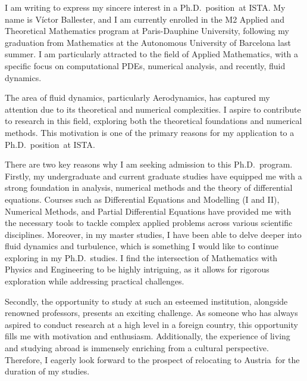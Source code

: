 \documentclass{letter}
\newcommand{\program}{Ph.D.\ position}
\newcommand{\uni}{ISTA}
\newcommand{\city}{Austria}
\begin{document}
\begin{letter}




  I am writing to express my sincere interest in a \program\ at \uni. My name is Víctor Ballester, and I am currently enrolled in the M2 Applied and Theoretical Mathematics program at Paris-Dauphine University, following my graduation from Mathematics at the Autonomous University of Barcelona last summer. I am particularly attracted to the field of Applied Mathematics, with a specific focus on computational PDEs, numerical analysis, and recently, fluid dynamics.


  The area of fluid dynamics, particularly Aerodynamics, has captured my attention due to its theoretical and numerical complexities. I aspire to contribute to research in this field, exploring both the theoretical foundations and numerical methods. This motivation is one of the primary reasons for my application to a \program\ at \uni.


  There are two key reasons why I am seeking admission to this Ph.D.\ program. Firstly, my undergraduate and current graduate studies have equipped me with a strong foundation in analysis, numerical methods and the theory of differential equations. Courses such as Differential Equations and Modelling (I and II), Numerical Methods, and Partial Differential Equations have provided me with the necessary tools to tackle complex applied problems across various scientific disciplines. Moreover, in my master studies, I have been able to delve deeper into fluid dynamics and turbulence, which is something I would like to continue exploring in my Ph.D.\ studies.
  I find the intersection of Mathematics with Physics and Engineering to be highly intriguing, as it allows for rigorous exploration while addressing practical challenges.

  Secondly, the opportunity to study at such an esteemed institution, alongside renowned professors, presents an exciting challenge. As someone who has always aspired to conduct research at a high level in a foreign country, this opportunity fills me with motivation and enthusiasm. Additionally, the experience of living and studying abroad is immensely enriching from a cultural perspective. Therefore, I eagerly look forward to the prospect of relocating to \city\ for the duration of my studies.


\end{letter}
\end{document}
